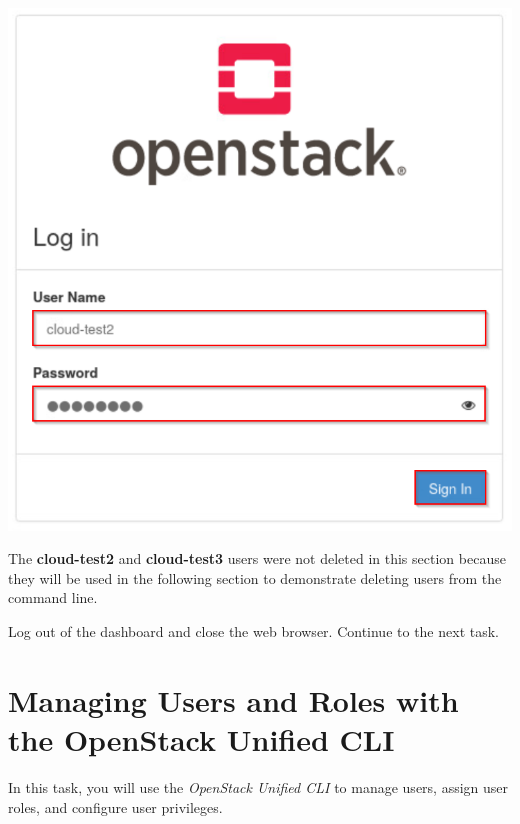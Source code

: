 \documentclass[letterpaper, 12pt]{article}
\begin{document}
\begin{enumerate}
\begin{labstep}
        \begin{center}
            \includegraphics[scale=0.5]{images/part3/step18.png}
        \end{center}
    \end{labstep}

    \begin{notebox}
        The \textbf{cloud-test2} and \textbf{cloud-test3} users were not deleted in this section because they will be used in the following section to demonstrate deleting users from the command line.
    \end{notebox}

    \begin{labstep}
        Log out of the dashboard and close the web browser.
        Continue to the next task.
    \end{labstep}
\end{enumerate}

\section{Managing Users and Roles with the OpenStack Unified CLI}\label{sec:managing-users-using-the-openstack-unified-cli}
In this task, you will use the \textit{OpenStack Unified CLI} to manage users, assign user roles, and configure user privileges.
\end{document}
